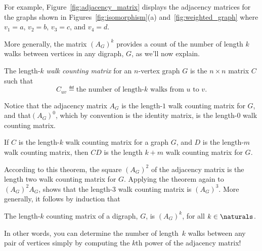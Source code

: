 For example, Figure~\ref{fig:adjacency_matrix} displays the adjacency
matrices for the graphs shown in Figures~\ref{fig:isomorphism}(a)
and~\ref{fig:weighted_graph} where $v_1 = a$, $v_2 = b$, $v_3 = c$,
and $v_4 = d$.
\fi

More generally, the matrix $(A_G)^k$ provides a count of the number of
length $k$ walks between vertices in any digraph, $G$, as we'll now
explain.

\begin{definition}
  The length-$k$ \emph{walk counting matrix}%
%
for an $n$-vertex graph $G$ is the $n \times n$ matrix $C$ such that
\begin{equation}\label{def:walk_matrix}
C_{uv} \eqdef \text{the number of length-$k$ walks from $u$ to $v$}.
\end{equation}
\end{definition}
Notice that the adjacency matrix $A_G$ is the length-$1$ walk counting
matrix for $G$, and that$(A_G)^0$, which by convention is the identity
matrix, is the length-0 walk counting matrix.

\begin{theorem}\label{thm:CkDm}
 If $C$ is the length-$k$ walk counting matrix for a graph $G$, and
 $D$ is the length-$m$ walk counting matrix, then $CD$ is the length
 $k+m$ walk counting matrix for $G$.
\end{theorem}

According to this theorem, the square $(A_G)^2$ of the adjacency
matrix is the length two walk counting matrix for $G$.  Applying the
theorem again to $(A_G)^2A_G$, shows that the length-3 walk counting
matrix is $(A_G)^3$.  More generally, it follows by induction that
\begin{corollary}\label{AGklenk}
The length-$k$ counting matrix of a digraph, $G$, is $(A_G)^k$, for
all $k \in \naturals$.
\end{corollary}
In other words, you can determine the number of length~$k$ walks
between any pair of vertices simply by computing the $k$th power of
the adjacency matrix!   \iffalse

